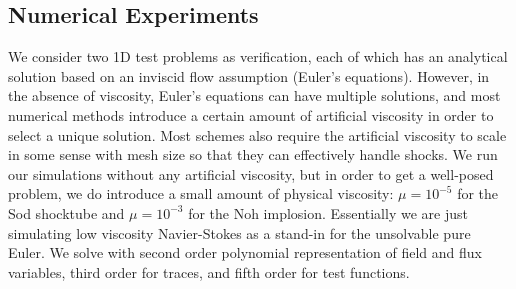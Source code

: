 \documentclass[preprint,12pt]{elsarticle}
\begin{document}
%                                                                                    
%                                                                                    
% 
\subsection{Numerical Experiments}
We consider two 1D test problems as verification, each of which has an analytical solution based on an inviscid flow assumption (Euler's equations).
However, in the absence of viscosity, Euler's equations can have multiple solutions, and most numerical methods introduce a certain amount of
artificial viscosity in order to select a unique solution.
Most schemes also require the artificial viscosity to scale in some sense with mesh size so that they can effectively handle shocks.
We run our simulations without any artificial viscosity, but in order to get a well-posed problem, we do introduce a small amount of physical
viscosity: $\mu=10^{-5}$ for the Sod shocktube and $\mu=10^{-3}$ for the Noh implosion.
Essentially we are just simulating low viscosity Navier-Stokes as a stand-in for the unsolvable pure Euler.
We solve with second order polynomial representation of field and flux variables, third order for traces, and fifth order for test functions.
\end{document}
